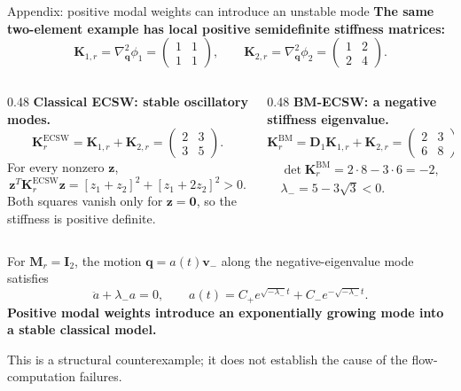 \documentclass[aspectratio=169]{beamer}
\newcommand{\vect}[1]{\boldsymbol{#1}}
\newcommand{\matr}[1]{\boldsymbol{#1}}
\begin{document}
\begin{frame}{Appendix: positive modal weights can introduce an unstable mode}
\hypertarget{bmecsw-structural-stability}{}
\fontsize{9}{10.5}\selectfont
\setlength{\parskip}{0pt}
\setlength{\abovedisplayskip}{2pt}
\setlength{\belowdisplayskip}{2pt}
\textbf{The same two-element example has local positive semidefinite stiffness matrices:}
\[
  \matr{K}_{1,r}=\nabla_{\vect{q}}^2\phi_1=\begin{pmatrix}1&1\\1&1\end{pmatrix},
  \qquad \matr{K}_{2,r}=\nabla_{\vect{q}}^2\phi_2=\begin{pmatrix}1&2\\2&4\end{pmatrix}.
\]
\begin{columns}[T,onlytextwidth]
\begin{column}{0.48\textwidth}
\textbf{Classical ECSW: stable oscillatory modes.}
\[
  \matr{K}_r^{\mathrm{ECSW}}=\matr{K}_{1,r}+\matr{K}_{2,r}
  =\begin{pmatrix}2&3\\3&5\end{pmatrix}.
\]
For every nonzero $\vect{z}$,
\[
  \vect{z}^T\matr{K}_r^{\mathrm{ECSW}}\vect{z}
  =[z_1+z_2]^2+[z_1+2z_2]^2>0.
\]
Both squares vanish only for $\vect{z}=\vect{0}$, so the stiffness is positive definite.
\end{column}
\begin{column}{0.48\textwidth}
\textbf{BM-ECSW: a negative stiffness eigenvalue.}
\[
  \matr{K}_r^{\mathrm{BM}}=\matr{D}_1\matr{K}_{1,r}+\matr{K}_{2,r}
  =\begin{pmatrix}2&3\\6&8\end{pmatrix}.
\]
\[
\begin{gathered}
  \det\matr{K}_r^{\mathrm{BM}}=2\cdot8-3\cdot6=-2,\\
  \lambda_-=5-3\sqrt3<0.
\end{gathered}
\]
\end{column}
\end{columns}
\smallskip
For $\matr{M}_r=\matr{I}_2$, the motion $\vect{q}=a(t)\vect{v}_-$ along the negative-eigenvalue mode satisfies
\[
  \ddot a+\lambda_-a=0,
  \qquad a(t)=C_+e^{\sqrt{-\lambda_-}t}+C_-e^{-\sqrt{-\lambda_-}t}.
\]
\smallskip
\textbf{Positive modal weights introduce an exponentially growing mode into a stable classical model.}\par
\smallskip
{\fontsize{8}{9}\selectfont This is a structural counterexample; it does not establish the cause of the flow-computation failures.}
\vfill
\hfill\hyperlink{bmecsw-structural-example}{}
\quad\hyperlink{bmecsw-mechanical-structure}{}
\end{frame}
\end{document}
